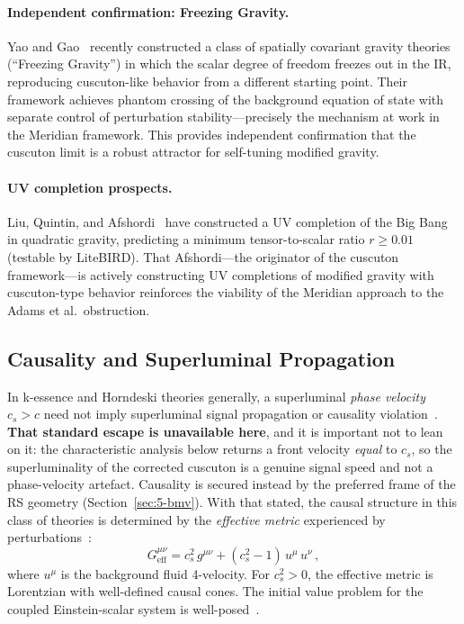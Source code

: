 \paragraph{Independent confirmation: Freezing Gravity.}
Yao and Gao~\cite{ch5:YaoGao2025} recently constructed a class of spatially covariant gravity theories (``Freezing Gravity'') in which the scalar degree of freedom freezes out in the IR, reproducing cuscuton-like behavior from a different starting point. Their framework achieves phantom crossing of the background equation of state with separate control of perturbation stability---precisely the mechanism at work in the Meridian framework. This provides independent confirmation that the cuscuton limit is a robust attractor for self-tuning modified gravity.

\paragraph{UV completion prospects.}
Liu, Quintin, and Afshordi~\cite{ch5:LiuQuintinAfshordi2026} have constructed a UV completion of the Big Bang in quadratic gravity, predicting a minimum tensor-to-scalar ratio $r \geq 0.01$ (testable by LiteBIRD). That Afshordi---the originator of the cuscuton framework---is actively constructing UV completions of modified gravity with cuscuton-type behavior reinforces the viability of the Meridian approach to the Adams et al.\ obstruction.

\subsection{Causality and Superluminal Propagation}
\label{sec:5-causality}

In k-essence and Horndeski theories generally, a superluminal \emph{phase velocity} $c_s > c$ need not imply superluminal signal propagation or causality violation~\cite{ch5:Babichev2008,ch5:Ellis2007}. \textbf{That standard escape is unavailable here}, and it is important not to lean on it: the characteristic analysis below returns a front velocity \emph{equal} to $c_s$, so the superluminality of the corrected cuscuton is a genuine signal speed and not a phase-velocity artefact. Causality is secured instead by the preferred frame of the RS geometry (Section~\ref{sec:5-bmv}). With that stated, the causal structure in this class of theories is determined by the \emph{effective metric} experienced by perturbations~\cite{ch5:Bekenstein1993}:
\begin{equation}
  G^{\mu\nu}_\mathrm{eff} = c_s^2\,g^{\mu\nu} + (c_s^2 - 1)\,u^\mu\,u^\nu\,,
  \label{eq:5-16}
\end{equation}
where $u^\mu$ is the background fluid 4-velocity. For $c_s^2 > 0$, the effective metric is Lorentzian with well-defined causal cones. The initial value problem for the coupled Einstein-scalar system is well-posed~\cite{ch5:Faraoni2009}.

